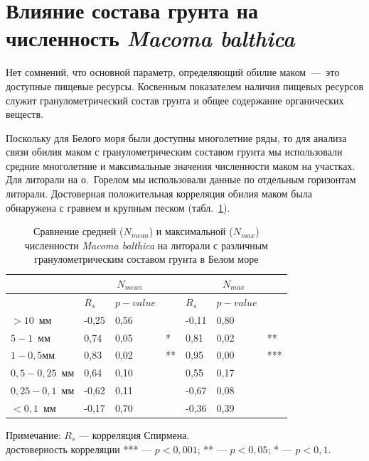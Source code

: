     \section{Влияние состава грунта на численность {\it Macoma balthica}}
Нет сомнений, что основной параметр, определяющий обилие маком~---\ это доступные пищевые   ресурсы.   
Косвенным   показателем   наличия   пищевых   ресурсов   служит гранулометрический состав грунта и общее содержание органических веществ. 

Поскольку для Белого моря были доступны многолетние ряды, то для анализа связи обилия маком с гранулометрическим составом грунта мы использовали средние многолетние и максимальные значения численности маком на участках. 
Для литорали на о.~Горелом мы использовали данные по отдельным горизонтам литорали.
Достоверная положительная корреляция обилия маком была обнаружена с гравием и крупным песком (табл.~\ref{tab:grunt_N_correlation_White}).
	\begin{table}[p]
	\begin{center}
		\caption{Сравнение средней ($N_{mean}$) и максимальной ($N_{max}$) численности {\it Macoma balthica} на литорали с различным гранулометрическим составом грунта в Белом море}
	\label{tab:grunt_N_correlation_White}
	\begin{tabularx}{\textwidth}{|l|XXl|XXl|}
	\hline
	& \multicolumn{3}{c|}{$N_{mean}$} & \multicolumn{3}{c|}{$N_{max}$}\\ \hline
           & $R_s$ & $p-value$ &    & $R_s$ & $p-value$ &     \\ \hline
	$> 10$~мм   & -0,25     & 0,56    &    & -0,11    & 0,80   &     \\ \hline
	$5 - 1$~мм  & 0,74      & 0,05    & *  & 0,81     & 0,02   & **  \\ \hline
	$1 - 0,5$мм  & 0,83      & 0,02    & ** & 0,95     & 0,00   & *** \\ \hline
	$0,5 - 0,25$~мм & 0,64      & 0,10    &    & 0,55     & 0,17   &     \\ \hline
	$0,25 - 0,1$~мм  & -0,62     & 0,11    &    & -0,67    & 0,08   &     \\ \hline
	$< 0,1$~мм  & -0,17     & 0,70    &    & -0,36    & 0,39   &    \\\hline
	\end{tabularx}
	\end{center}
	    {\footnotesize Примечание: $R_s$ --- корреляция Спирмена. \\
	    достоверность корреляции *** --- $p<0,001$; ** --- $p<0,05$; * --- $p<0,1$.}
	\end{table}


